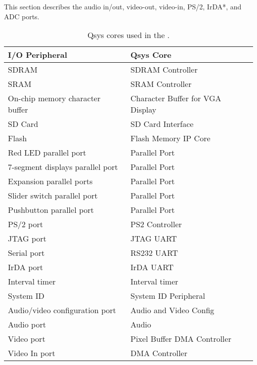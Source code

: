 This section describes the audio in/out, video-out, video-in, PS/2, IrDA*, and ADC ports.









\newpage

\begin{table}[h]
    \begin{center}
    \begin{tabular}{l|l}
            \textbf{I/O Peripheral}
            & \textbf{Qsys Core}
        \\\hline
            \rule{0in}{0.2in}SDRAM
            & SDRAM Controller
        \\
            SRAM
        &   SRAM Controller
        \\
            On-chip memory character buffer
				& Character Buffer for VGA Display
        \\
            SD Card
        &   SD Card Interface
        \\
            Flash
        &   Flash Memory IP Core
        \\
            Red LED parallel port
				& Parallel Port
        \\
            7-segment displays parallel port
				& Parallel Port
        \\
            Expansion parallel ports
				& Parallel Port
        \\
            Slider switch parallel port
				& Parallel Port
        \\
            Pushbutton parallel port
				& Parallel Port
        \\
            PS/2 port
				& PS2 Controller
        \\
            JTAG port
				& JTAG UART
        \\
            Serial port
				& RS232 UART
        \\
            IrDA port
				& IrDA UART
        \\
            Interval timer
				& Interval timer 
        \\
            System ID
				& System ID Peripheral
        \\
            Audio/video configuration port
				& Audio and Video Config
        \\
            Audio port
				& Audio
        \\
            Video port
				& Pixel Buffer DMA Controller
        \\
            Video In port
				& DMA Controller
        \\
    \end{tabular}
    \caption{Qsys cores used in the \systemNameFull.}
    \label{tab:sopcnames}
    \end{center}
\end{table}
\clearpage

